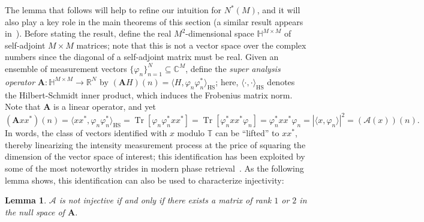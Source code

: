 \documentclass[times,10pt]{elsarticle}
\theoremstyle{plain}
\newtheorem{lemma}[theorem]{Lemma}
\begin{document}
The lemma that follows will help to refine our intuition for $N^*(M)$, and it will also play a key role in the main theorems of this section (a similar result appears in~\cite{HeinosaariMW:11}).
Before stating the result, define the real $M^2$-dimensional space $\mathbb{H}^{M\times M}$ of self-adjoint $M\times M$ matrices; note that this is not a vector space over the complex numbers since the diagonal of a self-adjoint matrix must be real.
Given an ensemble of measurement vectors $\{\varphi_n\}_{n=1}^N\subseteq\mathbb{C}^M$, 
define the \textit{super analysis operator} $\mathbf{A}\colon\mathbb{H}^{M\times M}\rightarrow\mathbb{R}^N$ by $(\mathbf{A}H)(n)=\langle H,\varphi_n\varphi_n^*\rangle_\mathrm{HS}$; here, $\langle\cdot,\cdot\rangle_\mathrm{HS}$ denotes the Hilbert-Schmidt inner product, which induces the Frobenius matrix norm.
Note that $\mathbf{A}$ is a linear operator, and yet 
\begin{equation*}
(\mathbf{A}xx^*)(n)
=\langle xx^*,\varphi_n\varphi_n^*\rangle_\mathrm{HS}
=\operatorname{Tr}[\varphi_n\varphi_n^*xx^*]
=\operatorname{Tr}[\varphi_n^*xx^*\varphi_n]
=\varphi_n^*xx^*\varphi_n
=|\langle x,\varphi_n\rangle|^2
=(\mathcal{A}(x))(n).
\end{equation*}
In words, the class of vectors identified with $x$ modulo $\mathbb{T}$ can be ``lifted'' to $xx^*$, thereby linearizing the intensity measurement process at the price of squaring the dimension of the vector space of interest; this identification has been exploited by some of the most noteworthy strides in modern phase retrieval~\cite{BalanBCE:09,CandesSV:11}.
As the following lemma shows, this identification can also be used to characterize injectivity:

\begin{lemma}
\label{lem.not injective rank 2}
$\mathcal{A}$ is not injective if and only if there exists a matrix of rank $1$ or $2$ in the null space of $\mathbf{A}$.
\end{lemma}
\end{document}

